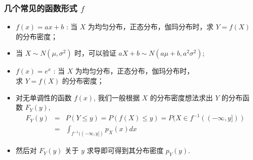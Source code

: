  \begin{frame}
 	\frametitle{几个常见的函数形式 $f$}
 	\begin{itemize}[<+-|alert@+>]
 		\item $f (x)=ax+b$ : 当 $X$ 为均匀分布，正态分布，伽玛分布时，求 $Y=f (X)$ 的分布密度；
 		\item 当 $X\sim N (\mu,\sigma^2)$ 时，可以验证 $aX+b\sim N (a\mu+b, a^2\sigma^2)$;
 		\item $f (x)=e^x$ : 当 $X$ 为均匀分布，正态分布，伽玛分布时，\\ 求 $Y=f (X)$ 的分布密度；
 		\item 对无单调性的函数 $f (x)$, 我们一般根据 $X$ 的分布密度想法求出 $Y$ 的分布函数 $F_Y (y)$,
 		\begin{eqnarray*}
 			F_Y(y)&=&P(Y\le y)=P(f(X)\le y)=P(X\in f^{-1}((-\infty, y]))\\
 			&=&\int_{f^{-1}((-\infty, y])}p_X(x)dx
 		\end{eqnarray*}
 		\item 然后对 $F_Y (y)$ 关于 $y$ 求导即可得到其分布密度 $p_Y (y)$.
 	\end{itemize}

 \end{frame}


